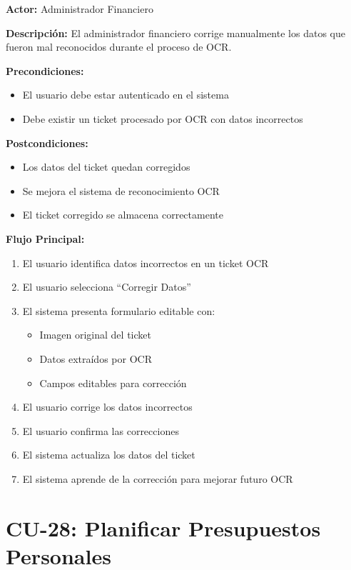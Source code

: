 \noindent\textbf{Actor:} Administrador Financiero

\noindent\textbf{Descripción:} El administrador financiero corrige manualmente los datos que fueron mal reconocidos durante el proceso de OCR.

\noindent\textbf{Precondiciones:}
\begin{itemize}
    \item El usuario debe estar autenticado en el sistema
    \item Debe existir un ticket procesado por OCR con datos incorrectos
\end{itemize}

\noindent\textbf{Postcondiciones:}
\begin{itemize}
    \item Los datos del ticket quedan corregidos
    \item Se mejora el sistema de reconocimiento OCR
    \item El ticket corregido se almacena correctamente
\end{itemize}

\noindent\textbf{Flujo Principal:}
\begin{enumerate}
    \item El usuario identifica datos incorrectos en un ticket OCR
    \item El usuario selecciona ``Corregir Datos''
    \item El sistema presenta formulario editable con:
    \begin{itemize}
        \item Imagen original del ticket
        \item Datos extraídos por OCR
        \item Campos editables para corrección
    \end{itemize}
    \item El usuario corrige los datos incorrectos
    \item El usuario confirma las correcciones
    \item El sistema actualiza los datos del ticket
    \item El sistema aprende de la corrección para mejorar futuro OCR
\end{enumerate}

\section{CU-28: Planificar Presupuestos Personales}

